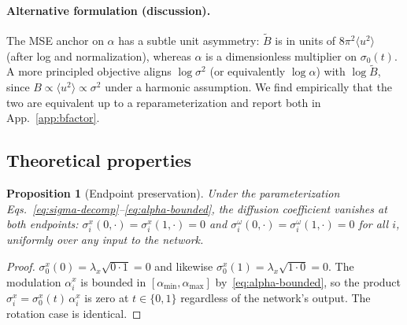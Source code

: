 \documentclass{article}
\newtheorem{proposition}{Proposition}
\theoremstyle{remark}
\theoremstyle{definition}
\begin{document}
\paragraph{Alternative formulation (discussion).}
The MSE anchor on $\alpha$ has a subtle unit asymmetry: $\tilde B$ is in units
of $8\pi^2\langle u^2\rangle$ (after log and normalization), whereas $\alpha$
is a dimensionless multiplier on $\sigma_0(t)$. A more principled objective
aligns $\log\sigma^2$ (or equivalently $\log\alpha$) with $\log\tilde B$, since
$B\propto\langle u^2\rangle\propto\sigma^2$ under a harmonic assumption. We
find empirically that the two are equivalent up to a reparameterization and
report both in App.~\ref{app:bfactor}.

\subsection{Theoretical properties}
\label{subsec:theory}

\begin{proposition}[Endpoint preservation]
\label{prop:endpoint}
Under the parameterization Eqs.~\eqref{eq:sigma-decomp}--\eqref{eq:alpha-bounded},
the diffusion coefficient vanishes at both endpoints:
$\sigma^x_i(0,\cdot)=\sigma^x_i(1,\cdot)=0$ and
$\sigma^\omega_i(0,\cdot)=\sigma^\omega_i(1,\cdot)=0$ for all $i$,
uniformly over any input to the network.
\end{proposition}

\begin{proof}
$\sigma^x_0(0)=\lambda_x\sqrt{0\cdot 1}=0$ and likewise
$\sigma^x_0(1)=\lambda_x\sqrt{1\cdot 0}=0$. The modulation $\alpha^x_i$ is
bounded in $[\alpha_{\min},\alpha_{\max}]$ by~\eqref{eq:alpha-bounded}, so the
product $\sigma^x_i=\sigma^x_0(t)\,\alpha^x_i$ is zero at $t\in\{0,1\}$
regardless of the network's output. The rotation case is identical.
\end{proof}
\end{document}
